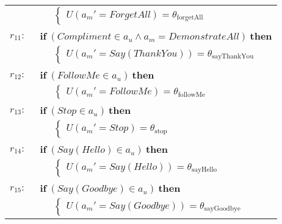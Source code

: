 \begin{footnotesize}
\begin{longtable}{p{1cm}l}
& $\;\;\;\;\; \begin{cases}U(\mathit{a_m}'\!=\!\mathit{ForgetAll})\!=\!\theta_{\mathrm{forgetAll}}\end{cases}$ \\ \\[-1mm]
$r_{11}: \ \ $& $\textbf{if} \ (\mathit{Compliment}\!\in\!\mathit{a_u} \land \mathit{a_m}\!=\!\mathit{DemonstrateAll}) \ \textbf{then}$ \\
& $\;\;\;\;\; \begin{cases}U(\mathit{a_m}'\!=\!\mathit{Say(ThankYou)})\!=\!\theta_{\mathrm{sayThankYou}}\end{cases}$ \\ \\[-1mm]
$r_{12}: \ \ $& $\textbf{if} \ (\mathit{FollowMe}\!\in\!\mathit{a_u}) \ \textbf{then}$ \\
& $\;\;\;\;\; \begin{cases}U(\mathit{a_m}'\!=\!\mathit{FollowMe})\!=\!\theta_{\mathrm{followMe}}\end{cases}$  \vspace{1mm} \\  \\[-2mm]
$r_{13}: \ \ $& $\textbf{if} \ (\mathit{Stop}\!\in\!\mathit{a_u}) \ \textbf{then} $\\
& $\;\;\;\;\; \begin{cases}U(\mathit{a_m}'\!=\!\mathit{Stop})\!=\!\theta_{\mathrm{stop}}\end{cases} $ \vspace{1mm} \\  \\[-2mm]
$r_{14}: \ \ $&$ \textbf{if} \ (\mathit{Say(Hello)}\!\in\!\mathit{a_u}) \ \textbf{then} $\\
& $\;\;\;\;\; \begin{cases}U(\mathit{a_m}'\!=\!\mathit{Say(Hello)})\!=\!\theta_{\mathrm{sayHello}}\end{cases}$  \vspace{1mm} \\  \\[-2mm]
$r_{15}: \ \ $&$ \textbf{if} \ (\mathit{Say(Goodbye)}\!\in\!\mathit{a_u}) \ \textbf{then} $\\
& $\;\;\;\;\; \begin{cases}U(\mathit{a_m}'\!=\!\mathit{Say(Goodbye)})\!=\!\theta_{\mathrm{sayGoodbye}}\end{cases}$    \vspace{1mm} \\ 
\end{longtable}
\end{footnotesize}

